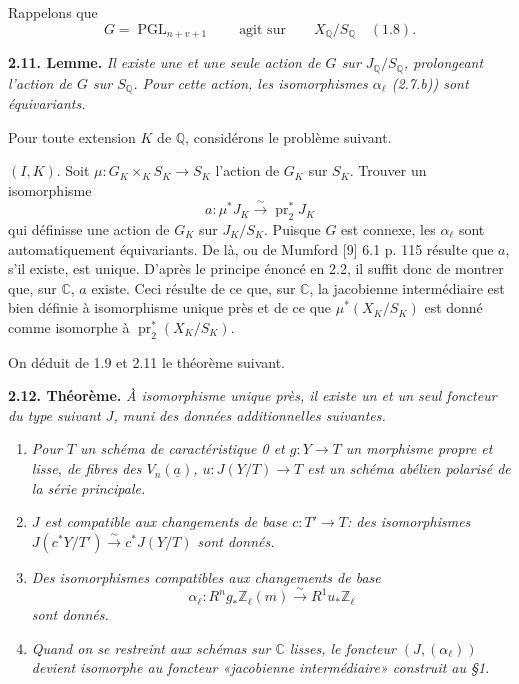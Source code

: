 \documentclass[10pt]{article}
\newcommand{\C}{\mathbb C}
\newcommand{\Q}{\mathbb Q}
\newcommand{\Z}{\mathbb Z}
\newcommand{\PGL}{\operatorname{PGL}}
\newcommand{\pr}{\operatorname{pr}}
\newcommand{\iso}{\xrightarrow{\sim}}
\newcommand{\sourcebreak}{\clearpage}
\begin{document}
Rappelons que
\[
G=\PGL_{n+v+1}\qquad\text{agit sur}\qquad X_\Q/S_\Q\quad(1.8).
\]

\noindent\textbf{2.11. Lemme.} \emph{Il existe une et une seule action de \(G\) sur \(J_\Q/S_\Q\), prolongeant l'action de \(G\) sur \(S_\Q\). Pour cette action, les isomorphismes \(\alpha_\ell\) (2.7.b)) sont équivariants.}

Pour toute extension \(K\) de \(\Q\), considérons le problème suivant.

\noindent\((I,K)\). Soit \(\mu:G_K\times_K S_K\longrightarrow S_K\) l'action de \(G_K\) sur \(S_K\). Trouver un isomorphisme
\[
a:\mu^*J_K\iso \pr_2^*J_K
\]
qui définisse une action de \(G_K\) sur \(J_K/S_K\). Puisque \(G\) est connexe, les \(\alpha_\ell\) sont automatiquement équivariants. De là, ou de Mumford [9] 6.1 p. 115 résulte que \(a\), s'il existe, est unique. D'après le principe énoncé en 2.2, il suffit donc de montrer que, sur \(\C\), \(a\) existe. Ceci résulte de ce que, sur \(\C\), la jacobienne intermédiaire est bien définie à isomorphisme unique près et de ce que \(\mu^*(X_K/S_K)\) est donné comme isomorphe à \(\pr_2^*(X_K/S_K)\).

On déduit de 1.9 et 2.11 le théorème suivant.

\noindent\textbf{2.12. Théorème.} \emph{À isomorphisme unique près, il existe un et un seul foncteur du type suivant \(J\), muni des données additionnelles suivantes.}
\begin{enumerate}[label=\alph*)]
\item \emph{Pour \(T\) un schéma de caractéristique 0 et \(g:Y\longrightarrow T\) un morphisme propre et lisse, de fibres des \(V_n(\underline a)\), \(u:J(Y/T)\longrightarrow T\) est un schéma abélien polarisé de la série principale.}
\item \emph{\(J\) est compatible aux changements de base \(c:T'\longrightarrow T\): des isomorphismes \(J(c^*Y/T')\iso c^*J(Y/T)\) sont donnés.}
\end{enumerate}


\sourcebreak
\begin{enumerate}[label=\alph*)]
\setcounter{enumi}{2}
\item \emph{Des isomorphismes compatibles aux changements de base}
\[
\alpha_\ell:R^ng_*\Z_\ell(m)\iso R^1u_*\Z_\ell
\]
\emph{sont donnés.}
\item \emph{Quand on se restreint aux schémas sur \(\C\) lisses, le foncteur \((J,(\alpha_\ell))\) devient isomorphe au foncteur «jacobienne intermédiaire» construit au \S1.}
\end{enumerate}
\end{document}

